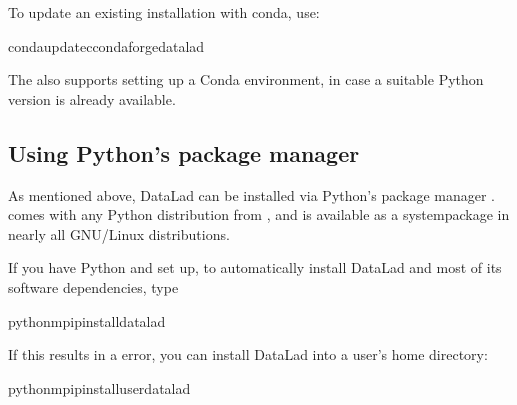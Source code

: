 \sphinxAtStartPar
To update an existing installation with conda, use:

\begin{sphinxVerbatim}[commandchars=\\\{\}]
condaupdate\PYGZhy{}cconda\PYGZhy{}forgedatalad
\end{sphinxVerbatim}

\sphinxAtStartPar
The  also supports setting up a Conda environment, in case
a suitable Python version is already available.

\ignorespaces 

\subsection{Using Python’s package manager }
\label{\detokenize{intro/installation:using-python-s-package-manager-pip}}\label{\detokenize{intro/installation:pipinstall}}\label{\detokenize{intro/installation:index-13}}
\sphinxAtStartPar
As mentioned above, DataLad can be installed via Python’s package manager .   comes with any Python distribution
from , and is available as a system\sphinxhyphen{}package
in nearly all GNU/Linux distributions.

\sphinxAtStartPar
If you have Python and  set up, to automatically install DataLad and
most of its software dependencies, type

\begin{sphinxVerbatim}[commandchars=\\\{\}]
python\PYGZhy{}mpipinstalldatalad
\end{sphinxVerbatim}

\sphinxAtStartPar
If this results in a  error, you can install DataLad into
a user’s home directory:

\begin{sphinxVerbatim}[commandchars=\\\{\}]
python\PYGZhy{}mpipinstall\PYGZhy{}\PYGZhy{}userdatalad
\end{sphinxVerbatim}

